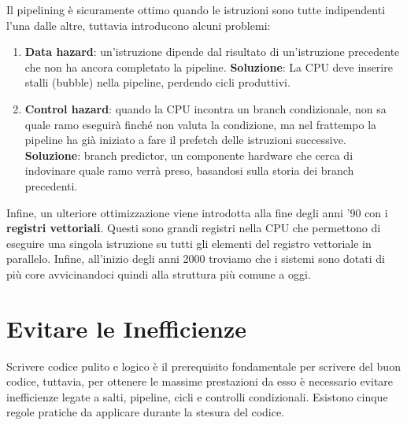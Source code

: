 Il pipelining è sicuramente ottimo quando le istruzioni sono tutte indipendenti l'una dalle altre, tuttavia introducono alcuni problemi:

\begin{enumerate}
    \item \textbf{Data hazard}: un'istruzione dipende dal risultato di un'istruzione precedente che non ha ancora completato la pipeline. \textbf{Soluzione}: La CPU deve inserire stalli (bubble) nella pipeline, perdendo cicli produttivi.
    \item \textbf{Control hazard}: quando la CPU incontra un branch condizionale, non sa quale ramo eseguirà finché non valuta la condizione, ma nel frattempo la pipeline ha già iniziato a fare il prefetch delle istruzioni successive.
    \textbf{Soluzione}: branch predictor, un componente hardware che cerca di indovinare quale ramo verrà preso, basandosi sulla storia dei branch precedenti.
\end{enumerate}

Infine, un ulteriore ottimizzazione viene introdotta alla fine degli anni '90 con i \textbf{registri vettoriali}. Questi sono grandi registri nella CPU che permettono di eseguire una singola istruzione su tutti gli elementi del registro vettoriale in parallelo.
Infine, all'inizio degli anni 2000 troviamo che i sistemi sono dotati di più core avvicinandoci quindi alla struttura più comune a oggi. 

\section{Evitare le Inefficienze}
Scrivere codice pulito e logico è il prerequisito fondamentale per scrivere del buon codice, tuttavia, per ottenere le massime prestazioni da esso è necessario evitare inefficienze legate a salti, pipeline, cicli e controlli condizionali. Esistono cinque regole pratiche da applicare durante la stesura del codice.
